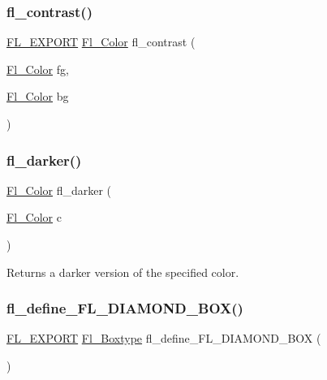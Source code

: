 \subsubsection{\texorpdfstring{fl\+\_\+contrast()}{fl\_contrast()}}
{\footnotesize\ttfamily \hyperlink{_fl___export_8_h_aa9ba29a18aee9d738370a06eeb4470fc}{F\+L\+\_\+\+E\+X\+P\+O\+RT} \hyperlink{_enumerations_8_h_a8b762953646f8abee866061f1af78a6a}{Fl\+\_\+\+Color} fl\+\_\+contrast (\begin{DoxyParamCaption}\item[{\hyperlink{_enumerations_8_h_a8b762953646f8abee866061f1af78a6a}{Fl\+\_\+\+Color}}]{fg,  }\item[{\hyperlink{_enumerations_8_h_a8b762953646f8abee866061f1af78a6a}{Fl\+\_\+\+Color}}]{bg }\end{DoxyParamCaption})}

\mbox{\label{_enumerations_8_h_a88fd2733842cb5d287650bcf160f2531}} 
\subsubsection{\texorpdfstring{fl\+\_\+darker()}{fl\_darker()}}
{\footnotesize\ttfamily \hyperlink{_enumerations_8_h_a8b762953646f8abee866061f1af78a6a}{Fl\+\_\+\+Color} fl\+\_\+darker (\begin{DoxyParamCaption}\item[{\hyperlink{_enumerations_8_h_a8b762953646f8abee866061f1af78a6a}{Fl\+\_\+\+Color}}]{c }\end{DoxyParamCaption})\hspace{0.3cm}{\ttfamily [inline]}}

Returns a darker version of the specified color. \mbox{\label{_enumerations_8_h_a137c1cb224a3e3aecb91608a1567e915}} 
\subsubsection{\texorpdfstring{fl\+\_\+define\+\_\+\+F\+L\+\_\+\+D\+I\+A\+M\+O\+N\+D\+\_\+\+B\+O\+X()}{fl\_define\_FL\_DIAMOND\_BOX()}}
{\footnotesize\ttfamily \hyperlink{_fl___export_8_h_aa9ba29a18aee9d738370a06eeb4470fc}{F\+L\+\_\+\+E\+X\+P\+O\+RT} \hyperlink{_enumerations_8_h_ae48bf9070f8541de17829f54ccacc6bc}{Fl\+\_\+\+Boxtype} fl\+\_\+define\+\_\+\+F\+L\+\_\+\+D\+I\+A\+M\+O\+N\+D\+\_\+\+B\+OX (\begin{DoxyParamCaption}{ }\end{DoxyParamCaption})}

